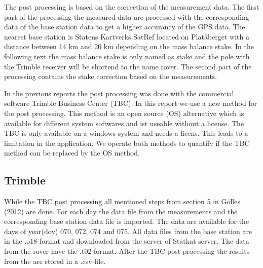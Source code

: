 
The post processing is based on the correction of the measurement data.
The first part of the processing the measured data are processed with the corresponding data of the base station data to get a higher accurancy of the GPS data.
The nearest base station is Statens Kartverks SatRef located on Platåberget with a distance between 14 km and 20 km depending on the mass balance stake.
In the following text the mass balance stake is only named as stake and the pole with the Trimble receiver will be shortend to the name rover.
The second part of the processing contains the stake correction based on the measurements.
\medskip

In the previous reports the post processing was done with the commercial software Trimble Business Center (TBC). 
In this report we use a new method for the post processing. 
This method is an open source (OS) alternative which is available for different system softwares and ist useable without a license. 
The TBC is only available on a windows system and needs a licens.
This leads to a limitation in the application. 
We operate both methods to quantify if the TBC method can be replaced by the OS method.
\medskip

\subsection{Trimble}

While the TBC post processing all mentioned steps from section 5 in Gölles (2012) are done.
For each day the data file from the measurements and the corresponding base station data file is imported. 
The data are available for the days of year(doy) 070, 072, 074 and 075.
All data files from the base station are in the .o18-format and downloaded from the server of Statkat server.
The data from the rover have the .t02 format. 
After the TBC post processing the results from the are stored in a .csv-file.
\medskip

